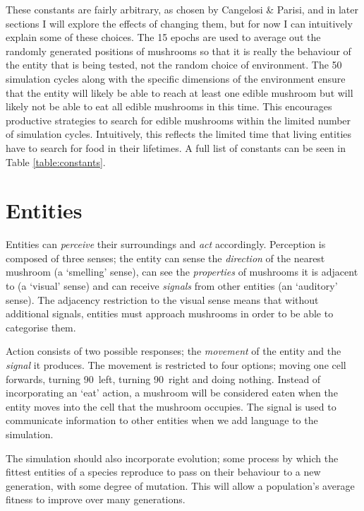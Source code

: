 \documentclass[12pt,a4paper]{report}
\begin{document}
These constants are fairly arbitrary, as chosen by Cangelosi \& Parisi, and in later sections I will explore the effects of changing them, but for now I can intuitively explain some of these choices. The 15 epochs are used to average out the randomly generated positions of mushrooms so that it is really the behaviour of the entity that is being tested, not the random choice of environment. The 50 simulation cycles along with the specific dimensions of the environment ensure that the entity will likely be able to reach at least one edible mushroom but will likely not be able to eat all edible mushrooms in this time. This encourages productive strategies to search for edible mushrooms within the limited number of simulation cycles. Intuitively, this reflects the limited time that living entities have to search for food in their lifetimes. A full list of constants can be seen in Table \ref{table:constants}.

\section{Entities}\label{section:entities}

Entities can \emph{perceive} their surroundings and \emph{act} accordingly. Perception is composed of three senses; the entity can sense the \emph{direction} of the nearest mushroom (a `smelling' sense), can see the \emph{properties} of mushrooms it is adjacent to (a `visual' sense) and can receive \emph{signals} from other entities (an `auditory' sense). The adjacency restriction to the visual sense means that without additional signals, entities must approach mushrooms in order to be able to categorise them.

Action consists of two possible responses; the \emph{movement} of the entity and the \emph{signal} it produces. The movement is restricted to four options; moving one cell forwards, turning 90\textdegree~left, turning 90\textdegree~right and doing nothing. Instead of incorporating an `eat' action, a mushroom will be considered eaten when the entity moves into the cell that the mushroom occupies. The signal is used to communicate information to other entities when we add language to the simulation.

The simulation should also incorporate evolution; some process by which the fittest entities of a species reproduce to pass on their behaviour to a new generation, with some degree of mutation. This will allow a population's average fitness to improve over many generations.
\end{document}
